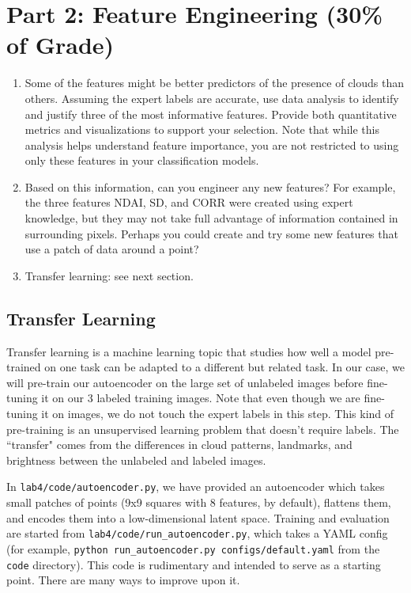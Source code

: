 \documentclass[letterpaper,12pt]{article}
\begin{document}
\section*{Part 2: Feature Engineering (30\% of Grade)}
\begin{enumerate}
    \item Some of the features might be better predictors of the presence of clouds than others. Assuming the expert labels are accurate, use data analysis to identify and justify three of the most informative features. Provide both quantitative metrics and visualizations to support your selection. Note that while this analysis helps understand feature importance, you are not restricted to using only these features in your classification models.
    \item Based on this information, can you engineer any new features? For example, the three features NDAI, SD, and CORR were created using expert knowledge, but they may not take full advantage of information contained in surrounding pixels. Perhaps you could create and try some new features that use a patch of data around a point?
    \item Transfer learning: see next section.
\end{enumerate}

\subsection{Transfer Learning}

Transfer learning is a machine learning topic that studies how well a model pre-trained on one task can be adapted to a different but related task. In our case, we will pre-train our autoencoder on the large set of unlabeled images before fine-tuning it on our 3 labeled training images. Note that even though we are fine-tuning it on images, we do not touch the expert labels in this step. This kind of pre-training is an unsupervised learning problem that doesn't require labels. The ``transfer" comes from the differences in cloud patterns, landmarks, and brightness between the unlabeled and labeled images.

In \texttt{lab4/code/autoencoder.py}, we have provided an autoencoder which takes small patches of points (9x9 squares with 8 features, by default), flattens them, and encodes them into a low-dimensional latent space. Training and evaluation are started from \texttt{lab4/code/run\_autoencoder.py}, which takes a YAML config (for example, \texttt{python run\_autoencoder.py configs/default.yaml} from the \texttt{code} directory). This code is rudimentary and intended to serve as a starting point. There are many ways to improve upon it.
\end{document}

